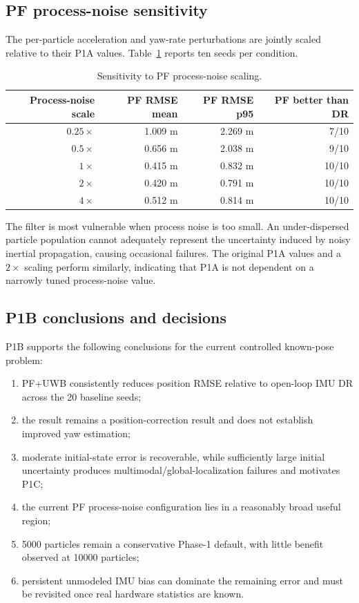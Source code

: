 \subsection{PF process-noise sensitivity}
The per-particle acceleration and yaw-rate perturbations are jointly scaled relative to their P1A values. Table~\ref{tab:p1b_process} reports ten seeds per condition.
\begin{table}[ht]
\centering
\caption{Sensitivity to PF process-noise scaling.}
\label{tab:p1b_process}
\begin{tabular}{rrrr}
\toprule
Process-noise scale & PF RMSE mean & PF RMSE p95 & PF better than DR\\
\midrule
$0.25\times$ & 1.009 m & 2.269 m & 7/10\\
$0.5\times$ & 0.656 m & 2.038 m & 9/10\\
$1\times$ & 0.415 m & 0.832 m & 10/10\\
$2\times$ & 0.420 m & 0.791 m & 10/10\\
$4\times$ & 0.512 m & 0.814 m & 10/10\\
\bottomrule
\end{tabular}
\end{table}
The filter is most vulnerable when process noise is too small. An under-dispersed particle population cannot adequately represent the uncertainty induced by noisy inertial propagation, causing occasional failures. The original P1A values and a $2\times$ scaling perform similarly, indicating that P1A is not dependent on a narrowly tuned process-noise value.

\subsection{P1B conclusions and decisions}
P1B supports the following conclusions for the current controlled known-pose problem:
\begin{enumerate}
    \item PF+UWB consistently reduces position RMSE relative to open-loop IMU DR across the 20 baseline seeds;
    \item the result remains a position-correction result and does not establish improved yaw estimation;
    \item moderate initial-state error is recoverable, while sufficiently large initial uncertainty produces multimodal/global-localization failures and motivates P1C;
    \item the current PF process-noise configuration lies in a reasonably broad useful region;
    \item 5000 particles remain a conservative Phase-1 default, with little benefit observed at 10000 particles;
    \item persistent unmodeled IMU bias can dominate the remaining error and must be revisited once real hardware statistics are known.
\end{enumerate}

